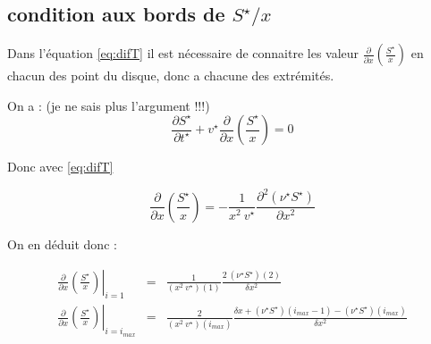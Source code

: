 \subsection{condition aux bords de $S^{\star}/x$}

Dans l'équation \eqref{eq:difT} il est nécessaire de connaitre les valeur $\frac{\partial}{\partial x}\left(\frac{S^{\star}}{x}\right)$ en chacun des point du disque, donc a chacune des extrémités. 

On a : (je ne sais plus l'argument !!!)
\begin{equation}
\frac{\partial S^{\star}}{\partial t^{\star}} + v^{\star} \frac{\partial}{\partial x} \left(\frac{S^{\star}}{x}\right)=0
\end{equation}

Donc avec \eqref{eq:difT}

\begin{equation}
\frac{\partial}{\partial x} \left(\frac{S^{\star}}{x}\right) = -\frac{1}{x^2\ v^{\star}} \frac{\partial^2 (\nu^{\star} S^{\star})}{\partial x^2}
\end{equation}

On en déduit donc :

\begin{eqnarray}
\left. \frac{\partial}{\partial x} \left(\frac{S^{\star}}{x}\right) \right|_{i=1 }&=& \frac{1}{(x^2\ v^{\star})(1)} \frac{2\ (\nu^{\star} S^{\star})(2)}{\delta x ^2} \\
\left. \frac{\partial}{\partial x} \left(\frac{S^{\star}}{x}\right) \right|_{i=i_{max}} &=& \frac{2}{(x^2\ v^{\star})(i_{max})} \frac{\delta x + (\nu^{\star} S^{\star})(i_{max}-1)- (\nu^{\star} S^{\star})(i_{max})}{\delta x^2}
\end{eqnarray}